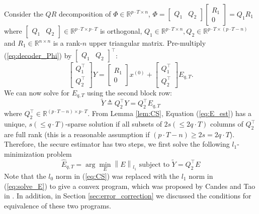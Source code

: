 \documentclass[twocolumn]{autart}    %
\newcommand{\norm}[1]{\left\lVert#1\right\rVert}
\newcommand{\rev}[1]{{\normalsize{{{\color{blue}#1}}}}}
\begin{document}
Consider the $QR$ decomposition\rev{\cite{QRdecomp}} of $\Phi \in \mathbb{R}^{p\cdot T \times n}$,
$	\Phi = \begin{bmatrix} Q_1 & Q_2 \end{bmatrix} \begin{bmatrix} R_1 \\ 0 \end{bmatrix} = Q_1 R_1 $
where $\begin{bmatrix} Q_1 & Q_2 \end{bmatrix} \in \mathbb{R}^{p\cdot T \times p\cdot T}$ is orthogonal, $Q_1 \in \mathbb{R}^{p\cdot T\times n}, Q_2 \in \mathbb{R}^{p\cdot T \times (p\cdot T-n)}$ and $R_1 \in \mathbb{R}^{n\times n}$ is a rank-$n$ upper triangular matrix. Pre-multiply (\ref{eq:decoder_Phi}) by $\begin{bmatrix} Q_1 & Q_2 \end{bmatrix} ^\top$:
\begin{equation}
	\begin{bmatrix} Q_1 ^\top \\ Q_2 ^\top \end{bmatrix} Y = \begin{bmatrix}R_1 \\ 0  \end{bmatrix} x^{(0)} + \begin{bmatrix} Q_1 ^\top \\ Q_2^\top \end{bmatrix} E_{q,T}.
	\label{eq:QR}
\end{equation}
We can now solve for $E_{q,T}$ using the second block row:
\begin{equation}
	\tilde Y \triangleq Q_2^\top Y = Q_2^\top E_{q,T}
	\label{eq:E_est}
\end{equation}
where $Q_2^\top \in \mathbb {R} ^{ (p\cdot T-n) \times p\cdot T}$. From Lemma \ref{lem:CS}, Equation (\ref{eq:E_est}) has a unique, $s(\le q\cdot T)$-sparse solution if all subsets of $2s(\le2 q\cdot T)$ columns of $Q_2^\top$ are full rank (this is a reasonable assumption if $ (p\cdot T-n) \ge 2s = 2q\cdot T$). 
Therefore, the secure \rev{estimator} has two steps, we first solve the following $l_1$-minimization problem
\begin{equation}
	\hat E_{q,T} = \arg \min_E \norm { E}_{l_1} \text{ subject to } \tilde Y = Q_2^\top E 
	\label{eq:solve_E}
\end{equation}
Note that the $l_0$ norm in (\ref{eq:CS}) was replaced with the $l_1$ norm in (\ref{eq:solve_E}) to give a convex program, which was proposed by Candes and Tao in \cite{Candes_Tao}. In addition, in Section \ref{sec:error_correction} we discussed the conditions for equivalence of these two programs.\\
\end{document}
